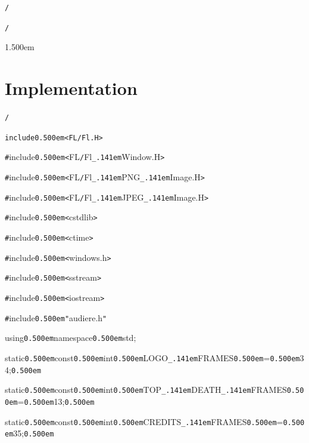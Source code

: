 \documentclass[12pt]{article}
\begin{document}
\noindent
{\tt *}{\tt /}
\tt\mc 

\noindent
{}\tt\mc {\tt /}{\tt /}

\noindent
{\tt /}{\tt *}{\tt *}

\noindent
\kern1.500em  \section{Implementation}
    \rm\mc 

\noindent
{\tt *}{\tt /}
\tt\mc 

\noindent
{}\tt\mc {\tt /}{\tt /}

\noindent
\tt\mc {\tt\#}include{\tt\mc \kern0.500em}{\tt <}FL{\tt /}Fl.H{\tt >}

\noindent
{}{\tt\#}include{\tt\mc \kern0.500em}{\tt <}FL{\tt /}Fl{\tt\_\kern.141em}Window.H{\tt >}

\noindent
{}{\tt\#}include{\tt\mc \kern0.500em}{\tt <}FL{\tt /}Fl{\tt\_\kern.141em}PNG{\tt\_\kern.141em}Image.H{\tt >}

\noindent
{}{\tt\#}include{\tt\mc \kern0.500em}{\tt <}FL{\tt /}Fl{\tt\_\kern.141em}JPEG{\tt\_\kern.141em}Image.H{\tt >}

\noindent
{}{\tt\#}include{\tt\mc \kern0.500em}{\tt <}cstdlib{\tt >}

\noindent
{}{\tt\#}include{\tt\mc \kern0.500em}{\tt <}ctime{\tt >}

\noindent
{}{\tt\#}include{\tt\mc \kern0.500em}{\tt <}windows.h{\tt >}

\noindent
{}{\tt\#}include{\tt\mc \kern0.500em}{\tt <}sstream{\tt >}

\noindent
{}{\tt\#}include{\tt\mc \kern0.500em}{\tt <}iostream{\tt >}

\noindent
{}{\tt\#}include{\tt\mc \kern0.500em}{\tt "}audiere.h{\tt "}

\noindent
{}using{\tt\mc \kern0.500em}namespace{\tt\mc \kern0.500em}std;

\noindent
{}static{\tt\mc \kern0.500em}const{\tt\mc \kern0.500em}int{\tt\mc \kern0.500em}LOGO{\tt\_\kern.141em}FRAMES{\tt\mc \kern0.500em}={\tt\mc \kern0.500em}34;{\tt\mc \kern0.500em}

\noindent
{}static{\tt\mc \kern0.500em}const{\tt\mc \kern0.500em}int{\tt\mc \kern0.500em}TOP{\tt\_\kern.141em}DEATH{\tt\_\kern.141em}FRAMES{\tt\mc \kern0.500em}={\tt\mc \kern0.500em}13;{\tt\mc \kern0.500em}

\noindent
{}static{\tt\mc \kern0.500em}const{\tt\mc \kern0.500em}int{\tt\mc \kern0.500em}CREDITS{\tt\_\kern.141em}FRAMES{\tt\mc \kern0.500em}={\tt\mc \kern0.500em}35;{\tt\mc \kern0.500em}
\end{document}
